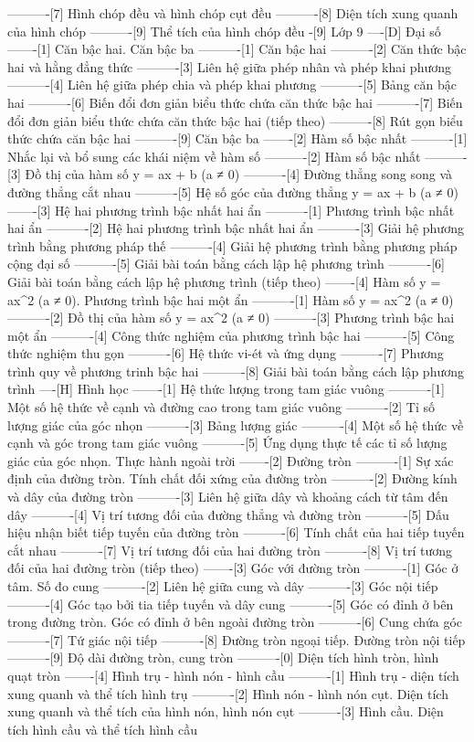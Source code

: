 ----------[7] Hình chóp đều và hình chóp cụt đều
----------[8] Diện tích xung quanh của hình chóp
----------[9] Thể tích của hình chóp đều
-[9] Lớp 9
----[D] Đại số
-------[1] Căn bậc hai. Căn bậc ba
----------[1] Căn bậc hai
----------[2] Căn thức bậc hai và hằng đẳng thức
----------[3] Liên hệ giữa phép nhân và phép khai phương
----------[4] Liên hệ giữa phép chia và phép khai phương
----------[5] Bảng căn bậc hai
----------[6] Biến đổi đơn giản biểu thức chứa căn thức bậc hai
----------[7] Biến đổi đơn giản biểu thức chứa căn thức bậc hai (tiếp theo)
----------[8] Rút gọn biểu thức chứa căn bậc hai
----------[9] Căn bậc ba
-------[2] Hàm số bậc nhất
----------[1] Nhắc lại và bổ sung các khái niệm về hàm số
----------[2] Hàm số bậc nhất
----------[3] Đồ thị của hàm số y = ax + b (a ≠ 0)
----------[4] Đường thẳng song song và đường thẳng cắt nhau
----------[5] Hệ số góc của đường thẳng y = ax + b (a ≠ 0)
-------[3] Hệ hai phương trình bậc nhất hai ẩn
----------[1] Phương trình bậc nhất hai ẩn
----------[2] Hệ hai phương trình bậc nhất hai ẩn
----------[3] Giải hệ phương trình bằng phương pháp thế
----------[4] Giải hệ phương trình bằng phương pháp cộng đại số
----------[5] Giải bài toán bằng cách lập hệ phương trình
----------[6] Giải bài toán bằng cách lập hệ phương trình (tiếp theo)
-------[4] Hàm số y = ax^2 (a ≠ 0). Phương trình bậc hai một ẩn
----------[1] Hàm số y = ax^2 (a ≠ 0)
----------[2] Đồ thị của hàm số y = ax^2 (a ≠ 0)
----------[3] Phương trình bậc hai một ẩn
----------[4] Công thức nghiệm của phương trình bậc hai
----------[5] Công thức nghiệm thu gọn
----------[6] Hệ thức vi-ét và ứng dụng
----------[7] Phương trình quy về phương trinh bậc hai
----------[8] Giải bài toán bằng cách lập phương trình
----[H] Hình học
-------[1] Hệ thức lượng trong tam giác vuông
----------[1] Một số hệ thức về cạnh và đường cao trong tam giác vuông
----------[2] Tỉ số lượng giác của góc nhọn
----------[3] Bảng lượng giác
----------[4] Một số hệ thức về cạnh và góc trong tam giác vuông
----------[5] Ứng dụng thực tế các tỉ số lượng giác của góc nhọn. Thực hành ngoài trời
-------[2] Đường tròn
----------[1] Sự xác định của đường tròn. Tính chất đối xứng của đường tròn
----------[2] Đường kính và dây của đường tròn
----------[3] Liên hệ giữa dây và khoảng cách từ tâm đến dây
----------[4] Vị trí tương đối của đường thẳng và đường tròn
----------[5] Dấu hiệu nhận biết tiếp tuyến của đường tròn
----------[6] Tính chất của hai tiếp tuyến cắt nhau
----------[7] Vị trí tương đối của hai đường tròn
----------[8] Vị trí tương đối của hai đường tròn (tiếp theo)
-------[3] Góc với đường tròn
----------[1] Góc ở tâm. Số đo cung
----------[2] Liên hệ giữa cung và dây
----------[3] Góc nội tiếp
----------[4] Góc tạo bởi tia tiếp tuyến và dây cung
----------[5] Góc có đỉnh ở bên trong đường tròn. Góc có đỉnh ở bên ngoài đường tròn
----------[6] Cung chứa góc
----------[7] Tứ giác nội tiếp
----------[8] Đường tròn ngoại tiếp. Đường tròn nội tiếp
----------[9] Độ dài đường tròn, cung tròn
----------[0] Diện tích hình tròn, hình quạt tròn
-------[4] Hình trụ - hình nón - hình cầu
----------[1] Hình trụ - diện tích xung quanh và thể tích hình trụ
----------[2] Hình nón - hình nón cụt. Diện tích xung quanh và thể tích của hình nón, hình nón cụt
----------[3] Hình cầu. Diện tích hình cầu và thể tích hình cầu
